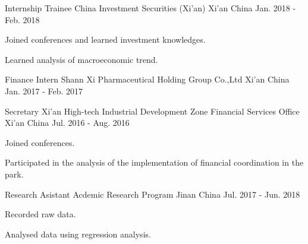


\begin{cventries}


\cventry
{Internship Trainee} %
{China Investment Securities (Xi'an)} %
{Xi'an China} %
{Jan. 2018 - Feb. 2018} %
{ %
\begin{cvitems}
\item {Joined conferences and learned investment knowledges.}
\item {Learned analysis of macroeconomic trend.}
\end{cvitems}
}


\cventry
{Finance Intern} %
{Shann Xi Pharmaceutical Holding Group Co.,Ltd} %
{Xi'an China} %
{Jan. 2017 - Feb. 2017} %
{ %
}


\cventry
{Secretary} %
{Xi'an High-tech Industrial Development Zone Financial Services Office} %
{Xi'an China} %
{Jul. 2016 - Aug. 2016} %
{ %
\begin{cvitems}
\item {Joined conferences.}
\item {Participated in the analysis of the implementation of financial coordination in the park.}
\end{cvitems} 
}


\cventry
{Research Asistant} %
{Acdemic Research Program} %
{Jinan China} %
{Jul. 2017 - Jun. 2018} %
{ %
\begin{cvitems}
\item {Recorded raw data.}
\item {Analysed data using regression analysis.}
\end{cvitems}
}



\end{cventries}